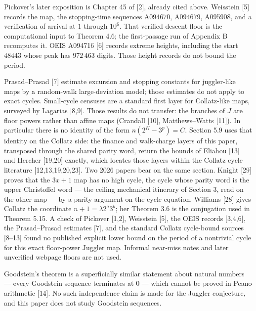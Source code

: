\documentclass[12pt]{article}
\begin{document}
Pickover's later exposition is Chapter 45 of {[}2{]}, already cited
above. Weisstein {[}5{]} records the map, the stopping-time sequences
A094670, A094679, A095908, and a verification of arrival at \(1\)
through \(10^6\). That verified descent floor is the computational input
to Theorem 4.6; the first-passage run of Appendix B recomputes it. OEIS
A094716 {[}6{]} records extreme heights, including the start \(48443\)
whose peak has \(972\,463\) digits. Those height records do not bound
the period.

Prasad--Prasad {[}7{]} estimate excursion and stopping constants for
juggler-like maps by a random-walk large-deviation model; those
estimates do not apply to exact cycles. Small-cycle censuses are a
standard first layer for Collatz-like maps, surveyed by Lagarias
{[}8,9{]}. Those results do not transfer: the branches of \(J\) are
floor powers rather than affine maps (Crandall {[}10{]}, Matthews--Watts
{[}11{]}). In particular there is no identity of the form
\(n(2^K-3^p)=C\). Section 5.9 uses that identity on the Collatz side:
the finance and walk-charge layers of this paper, transposed through the
shared parity word, return the bounds of Eliahou {[}13{]} and Hercher
{[}19,20{]} exactly, which locates those layers within the Collatz cycle
literature {[}12,13,19,20,23{]}. Two 2026 papers bear on the same
section. Knight {[}29{]} proves that the \(3x+1\) map has no high cycle,
the cycle whose parity word is the upper Christoffel word --- the
ceiling mechanical itinerary of Section 3, read on the other map --- by
a parity argument on the cycle equation. Williams {[}28{]} gives Collatz
the coordinate \(n+1=\lambda2^a3^b\); her Theorem 3.6 is the conjugation
used in Theorem 5.15. A check of Pickover {[}1,2{]}, Weisstein {[}5{]},
the OEIS records {[}3,4,6{]}, the Prasad--Prasad estimates {[}7{]}, and
the standard Collatz cycle-bound sources {[}8--13{]} found no published
explicit lower bound on the period of a nontrivial cycle for this exact
floor-power Juggler map. Informal near-miss notes and later unverified
webpage floors are not used.

Goodstein's theorem is a superficially similar statement about natural
numbers --- every Goodstein sequence terminates at \(0\) --- which
cannot be proved in Peano arithmetic {[}14{]}. No such independence
claim is made for the Juggler conjecture, and this paper does not study
Goodstein sequences.
\end{document}
